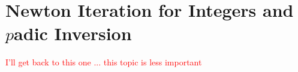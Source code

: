 
\section{Newton Iteration for Integers and \texorpdfstring{$p$}-adic Inversion}

\textcolor{red}{I'll get back to this one ... this topic is less important}
